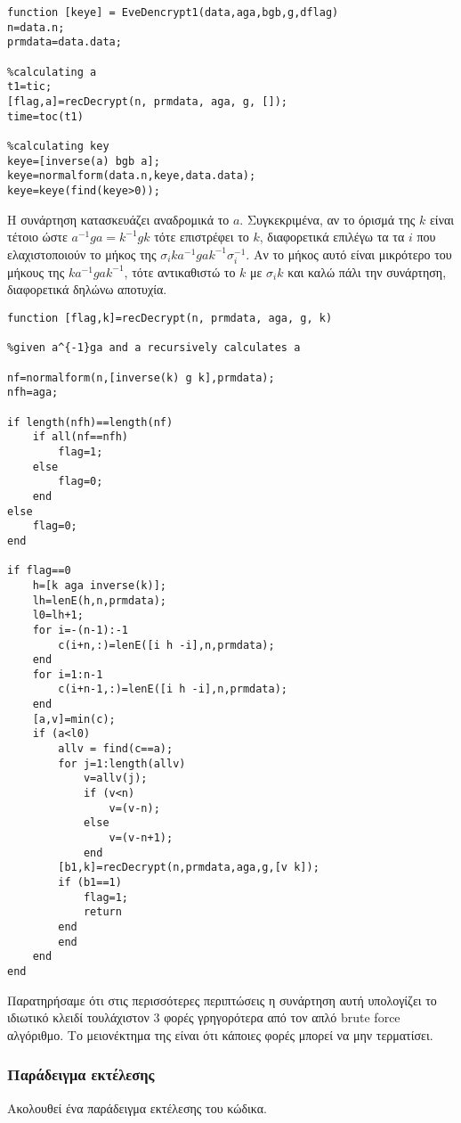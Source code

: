 \begin{lstlisting}
function [keye] = EveDencrypt1(data,aga,bgb,g,dflag)
n=data.n;
prmdata=data.data;

%calculating a
t1=tic;
[flag,a]=recDecrypt(n, prmdata, aga, g, []);
time=toc(t1)

%calculating key
keye=[inverse(a) bgb a];
keye=normalform(data.n,keye,data.data);
keye=keye(find(keye>0));
\end{lstlisting}

Η συνάρτηση  κατασκευάζει αναδρομικά το $ a $. 
Συγκεκριμένα, αν το όρισμά της $ k $ είναι τέτοιο ώστε $ a^{-1}ga=k^{-1}gk$ τότε επιστρέφει το $ k $, διαφορετικά επιλέγω τα τα $ i $ που ελαχιστοποιούν το μήκος της $ \sigma_i k a^{-1}ga k^{-1} \sigma_i^{-1}$. Αν το μήκος αυτό είναι μικρότερο του μήκους της  $ k a^{-1}ga k^{-1}$, τότε αντικαθιστώ το $ k $ με $ \sigma_ik $ και καλώ πάλι την συνάρτηση, διαφορετικά δηλώνω αποτυχία.

\begin{lstlisting}
function [flag,k]=recDecrypt(n, prmdata, aga, g, k)

%given a^{-1}ga and a recursively calculates a

nf=normalform(n,[inverse(k) g k],prmdata);
nfh=aga;

if length(nfh)==length(nf)
    if all(nf==nfh)
        flag=1;
    else
        flag=0;
    end
else
    flag=0;
end
  
if flag==0 
    h=[k aga inverse(k)];
    lh=lenE(h,n,prmdata);
    l0=lh+1;
    for i=-(n-1):-1
        c(i+n,:)=lenE([i h -i],n,prmdata);
    end
    for i=1:n-1
        c(i+n-1,:)=lenE([i h -i],n,prmdata);
    end
    [a,v]=min(c);
    if (a<l0)
        allv = find(c==a);
        for j=1:length(allv)
            v=allv(j);
            if (v<n)
                v=(v-n);
            else
                v=(v-n+1);
            end
        [b1,k]=recDecrypt(n,prmdata,aga,g,[v k]);
        if (b1==1)
            flag=1;
            return
        end
        end
    end
end
\end{lstlisting}

Παρατηρήσαμε ότι στις περισσότερες περιπτώσεις η συνάρτηση αυτή υπολογίζει το ιδιωτικό κλειδί τουλάχιστον 3 φορές γρηγορότερα από τον απλό brute force αλγόριθμο. Το μειονέκτημα της είναι ότι κάποιες φορές μπορεί να μην τερματίσει.

\subsubsection{Παράδειγμα εκτέλεσης}
Ακολουθεί ένα παράδειγμα εκτέλεσης του κώδικα.

